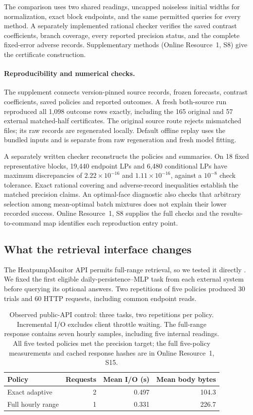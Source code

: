\documentclass[12pt]{article}
\begin{document}
The comparison uses two shared readings, uncapped noiseless initial widths for
normalization, exact block endpoints, and the same permitted queries for
every method.  A separately implemented rational checker verifies the
saved contrast coefficients, branch coverage, every reported precision
status, and the complete fixed-error adverse records.  Supplementary
methods (Online Resource~1, S8) give the certificate construction.
\paragraph{Reproducibility and numerical checks.}
The supplement connects version-pinned source records, frozen forecasts,
contrast coefficients, saved policies and reported outcomes. A fresh
both-source run reproduced all 1,098 outcome rows exactly, including the
165 original and 57 external matched-half certificates. The original
source route rejects mismatched files; its raw records are regenerated
locally. Default offline replay uses the bundled inputs and is separate
from raw regeneration and fresh model fitting.

A separately written checker reconstructs the policies and summaries. On
18 fixed representative blocks, 19,440 endpoint LPs and 6,480 conditional
LPs have maximum discrepancies of $2.22\times10^{-16}$ and
$1.11\times10^{-16}$, against a $10^{-8}$ check tolerance. Exact rational
covering and adverse-record inequalities establish the matched precision
claims. An optimal-face diagnostic also checks that arbitrary selection
among mean-optimal batch mixtures does not explain their lower recorded
success. Online Resource~1, S8 supplies the full checks and the
results-to-command map identifies each reproduction entry point.
\subsection{What the retrieval interface changes}
\label{sec:actual-api}
The HeatpumpMonitor API permits full-range retrieval, so we tested it
directly \citep{hpmapi,hpmcode}. We fixed the first eligible
daily-persistence--MLP task from each external system before querying its
optional answers. Two repetitions of five policies produced 30 trials
and 60 HTTP requests, including common endpoint reads.

\begin{table}[htbp]\centering\small
\caption{Observed public-API control: three tasks, two repetitions per
policy. Incremental I/O excludes client throttle waiting. The full-range
response contains seven hourly samples, including five internal readings.
All five tested policies met the precision
target; the full five-policy measurements and cached response hashes are
in Online Resource~1, S15.}\label{tab:actual-api}
\begin{tabular}{lrrr}\toprule
Policy & Requests & Mean I/O (s) & Mean body bytes\\\midrule
Exact adaptive & 2 & 0.497 & 104.3\\
Full hourly range & 1 & 0.331 & 226.7\\\bottomrule
\end{tabular}\end{table}
\end{document}
